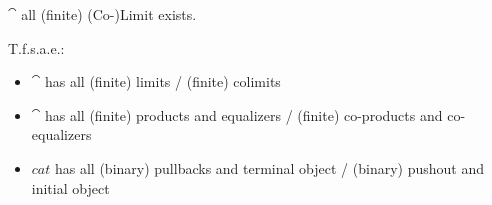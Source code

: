 \documentclass[preview]{standalone}
\begin{document}
%
\begin{definition}
	$\cat$ \St all (finite) (Co-)Limit exists.
\end{definition}
%
\begin{proposition}
T.f.s.a.e.:
\begin{itemize}
	\item $\cat$ has all (finite) limits / (finite) colimits
	\item $\cat$ has all (finite) products and equalizers / (finite) co-products and co-equalizers
	\item $cat$ has all (binary) pullbacks and terminal object / (binary) pushout and initial object
\end{itemize}

\end{proposition}
\end{document}
